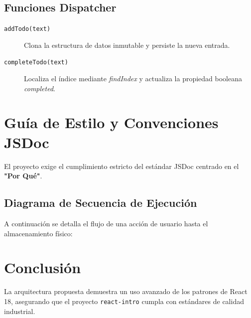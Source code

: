 \documentclass[12pt,a4paper]{report}
\begin{document}
\section{Funciones Dispatcher}
\begin{description}
    \item[\texttt{addTodo(text)}] Clona la estructura de datos inmutable y persiste la nueva entrada.
    \item[\texttt{completeTodo(text)}] Localiza el índice mediante \textit{findIndex} y actualiza la propiedad booleana \textit{completed}.
\end{description}

\chapter{Guía de Estilo y Convenciones JSDoc}

El proyecto exige el cumplimiento estricto del estándar JSDoc centrado en el \textbf{"Por Qué"}.

\section{Diagrama de Secuencia de Ejecución}
A continuación se detalla el flujo de una acción de usuario hasta el almacenamiento físico:

\begin{center}
\end{center}

\chapter*{Conclusión}
La arquitectura propuesta demuestra un uso avanzado de los patrones de React 18, asegurando que el proyecto \texttt{react-intro} cumpla con estándares de calidad industrial.
\end{document}
